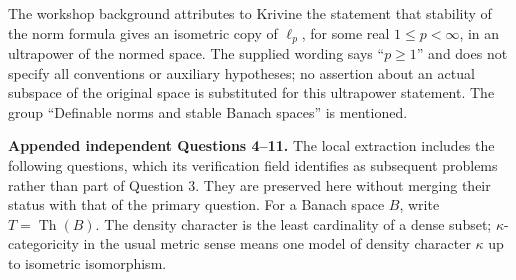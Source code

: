 \documentclass[11pt]{article}
\begin{document}
The workshop background attributes to Krivine the statement that stability of the norm formula gives an isometric copy of \(\ell_p\), for some real \(1\leq p<\infty\), in an ultrapower of the normed space. The supplied wording says ``\(p\geq1\)'' and does not specify all conventions or auxiliary hypotheses; no assertion about an actual subspace of the original space is substituted for this ultrapower statement. The group ``Definable norms and stable Banach spaces'' is mentioned.

\textbf{Appended independent Questions 4--11.} The local extraction includes the following questions, which its verification field identifies as subsequent problems rather than part of Question 3. They are preserved here without merging their status with that of the primary question. For a Banach space \(B\), write \(T=\operatorname{Th}(B)\). The density character is the least cardinality of a dense subset; \(\kappa\)-categoricity in the usual metric sense means one model of density character \(\kappa\) up to isometric isomorphism.
\end{document}
